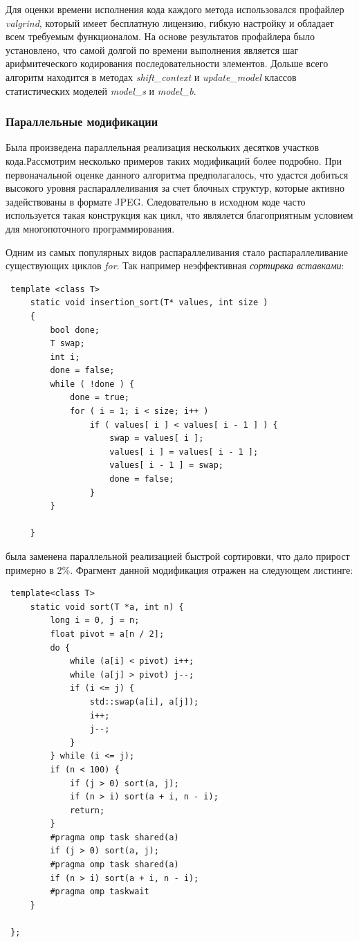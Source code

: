 \documentclass{matmex-diploma-custom}
\begin{document}
Для оценки времени исполнения кода каждого метода использовался профайлер \emph{valgrind}, который имеет бесплатную лицензию, гибкую настройку и обладает всем требуемым функционалом. На основе результатов профайлера было установлено, что самой долгой по времени выполнения является шаг арифмитеческого кодирования последовательности элементов. Дольше всего алгоритм находится в методах \emph{shift\_context} и \emph{update\_model} классов статистических моделей \emph{model\_s} и \emph{model\_b}.

\subsubsection{Параллельные модификации}
Была произведена параллельная реализация нескольких десятков участков кода.Рассмотрим несколько примеров таких модификаций более подробно.
При первоначальной оценке данного алгоритма предполагалось, что удастся добиться высокого уровня распараллеливания за счет блочных  структур, которые активно задействованы в формате JPEG. Следовательно в исходном коде часто используется такая конструкция как цикл, что являлется благоприятным условием для многопоточного программирования.

Одним из самых популярных видов распараллеливания стало распараллеливание существующих циклов \emph{for}. Так например неэффективная \emph{сортирвка вставками}:

 \begin{lstlisting}
 template <class T>
     static void insertion_sort(T* values, int size )
     {
         bool done;
         T swap;
         int i;
         done = false;
         while ( !done ) {
             done = true;
             for ( i = 1; i < size; i++ )
                 if ( values[ i ] < values[ i - 1 ] ) {
                     swap = values[ i ];
                     values[ i ] = values[ i - 1 ];
                     values[ i - 1 ] = swap;
                     done = false;
                 }
         }

     }
 \end{lstlisting}

 была заменена параллельной реализацией быстрой сортировки, что дало прирост примерно в 2\%. Фрагмент данной модификация отражен на следующем листинге:

 \begin{lstlisting}
 template<class T>
     static void sort(T *a, int n) {
         long i = 0, j = n;
         float pivot = a[n / 2];
         do {
             while (a[i] < pivot) i++;
             while (a[j] > pivot) j--;
             if (i <= j) {
                 std::swap(a[i], a[j]);
                 i++;
                 j--;
             }
         } while (i <= j);
         if (n < 100) {
             if (j > 0) sort(a, j);
             if (n > i) sort(a + i, n - i);
             return;
         }
         #pragma omp task shared(a)
         if (j > 0) sort(a, j);
         #pragma omp task shared(a)
         if (n > i) sort(a + i, n - i);
         #pragma omp taskwait
     }

 };
 \end{lstlisting}
\end{document}
